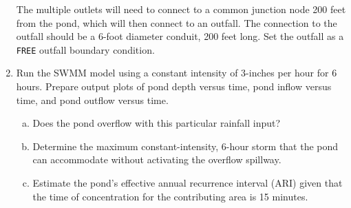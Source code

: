 \documentclass[12pt]{article}
\begin{document}
\begin{enumerate}
The multiple outlets will need to connect to a common junction node 200 feet from the pond, which will then connect to an outfall.  The connection to the outfall should be a 6-foot diameter conduit, 200 feet long.   Set the outfall as a \texttt{FREE} outfall boundary condition.
\item Run the SWMM model using a constant intensity of 3-inches per hour for 6 hours.  Prepare output plots of pond depth versus time, pond inflow versus time, and pond outflow versus time.
\begin{enumerate}[a)]
\item Does the pond overflow with this particular rainfall input?
\item Determine the maximum constant-intensity, 6-hour storm that the pond can accommodate without activating the overflow spillway.
\item Estimate the pond's effective annual recurrence interval (ARI) given that the time of concentration for the contributing area is 15 minutes.  
\end{enumerate}


\end{enumerate}
\end{document}
